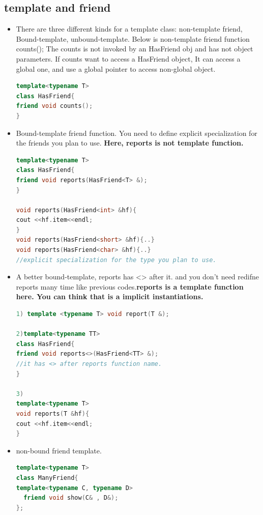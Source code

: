 \documentclass[a4paper,12pt,twoside]{book}
\begin{document}
\subsection{template and friend}
\begin{itemize}

\item  There are three different kinds for a template class: non-template friend,  Bound-template, unbound-template. Below is non-template friend function counts(); The counts is not invoked by an HasFriend obj and has not object parameters.  If counts want to access a HasFriend object, It can access a global one, and use a global pointer to access non-global object.
\begin{lstlisting}[frame=single, language=c++]
template<typename T>
class HasFriend{
friend void counts();
}
\end{lstlisting}

\item Bound-template friend function. You need to define explicit specialization for the friends you plan to use. \textbf{Here, reports is not template function. }
\begin{lstlisting}[frame=single, language=c++]
template<typename T>
class HasFriend{
friend void reports(HasFriend<T> &);
}

void reports(HasFriend<int> &hf){
cout <<hf.item<<endl;
}
void reports(HasFriend<short> &hf){..}
void reports(HasFriend<char> &hf){..}
//explicit specialization for the type you plan to use.
\end{lstlisting}

\item A better bound-template, reports has <> after it.  and you don't need redifne reports many time like previous codes.\textbf{reports is a template function here. You can think that is a implicit instantiations. }
\begin{lstlisting}[frame=single, language=c++]
1) template <typename T> void report(T &);

2)template<typename TT>
class HasFriend{
friend void reports<>(HasFriend<TT> &);
//it has <> after reports function name.
}

3)
template<typename T>
void reports(T &hf){
cout <<hf.item<<endl;
}
\end{lstlisting}

\item non-bound friend template.
\begin{lstlisting}[frame=single, language=c++]
template<typename T>
class ManyFriend{
template<typename C, typename D>
  friend void show(C& , D&);
};


\end{lstlisting}
\end{itemize}
\end{document}

